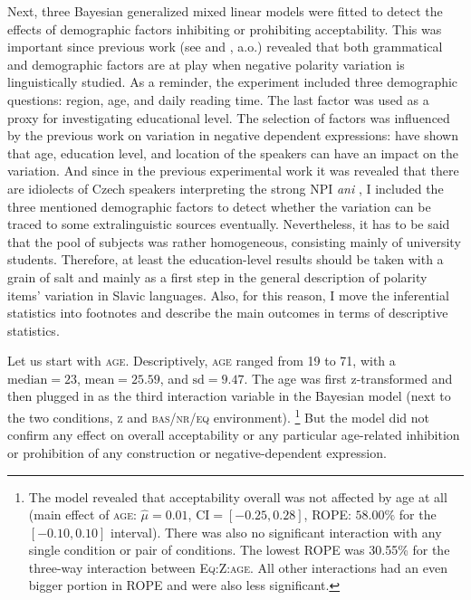\documentclass[output=paper,colorlinks,citecolor=brown]{langscibook}
\begin{document}
Next, three Bayesian generalized mixed linear models were fitted to detect the effects of demographic factors inhibiting or prohibiting acceptability. This was important since previous work (see \citealt{burnett2015variable} and \citealt{burnett2018structural}, a.o.) revealed that both grammatical and demographic factors are at play when negative polarity variation is linguistically studied. As a reminder, the experiment included three demographic questions: region, age, and daily reading time. The last factor was used as a proxy for investigating educational level. The selection of factors was influenced by the previous work on variation in negative dependent expressions: \citet{burnett2015variable,burnett2015variable} have shown that age, education level, and location of the speakers can have an impact on the variation. And since in the previous experimental work it was revealed that there are idiolects of Czech speakers interpreting the strong NPI \textit{ani} \citep{docekaldotlacilsubber,dovcekal2020n}, I included the three mentioned demographic factors to detect whether the variation can be traced to some extralinguistic sources eventually. Nevertheless, it has to be said that the pool of subjects was rather homogeneous, consisting mainly of university students. Therefore, at least the education-level results should be taken with a grain of salt and mainly as a first step in the general description of polarity items' variation in Slavic languages. Also, for this reason, I move the inferential statistics into footnotes and describe the main outcomes in terms of descriptive statistics.

Let us start with \textsc{age}. Descriptively, \textsc{age} ranged from 19 to 71, with a $\text{median}=23$, $\text{mean}=25.59$, and $\text{sd}=9.47$. The age was first z-transformed and then plugged in as the third interaction variable in the Bayesian model (next to the two conditions, \textsc{z} and \textsc{bas/nr/eq} environment).%
\footnote{The model revealed that acceptability overall was not affected by age at all (main effect of \textsc{age}: $\hat{\mu}=0.01$, $\mathrm{CI}=[-0.25,  0.28]$, ROPE: $58.00\%$ for the $[-0.10, 0.10]$ interval). There was also no significant interaction with any single condition or pair of conditions. The lowest ROPE was 30.55\% for the three-way interaction between \textsc{Eq:Z:age}. All other interactions had an even bigger portion in ROPE and were also less significant.}
But the model did not confirm any effect on overall acceptability or any particular age-related inhibition or prohibition of any construction or negative-dependent expression.  
\end{document}

